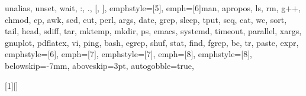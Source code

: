 {{         unalias, unset, wait, :, ., [, ]},
emphstyle=[5]{\color{builtins-color}}, %
emph=[6]{man, apropos, ls, rm, g++, chmod, cp, awk, sed, cut, perl, args, date, grep, sleep, tput, seq, cat, wc, sort, tail,
         head, sdiff, tar, mktemp, mkdir, ps, emacs, systemd, timeout, parallel, xargs, gnuplot, pdflatex, vi, ping, bash,
         egrep, shuf, stat, find, fgrep, bc, tr, paste, expr},
emphstyle=[6]{\color{external-color}}, %
emph=[7]{},
emphstyle=[7]{\color{variables-color}}, %
emph=[8]{},
emphstyle=[8]{\color{builtins-color}}, %
%
belowskip=-7mm,
aboveskip=3pt,
autogobble=true, %
}

[1][] %
    {\lstset{style=MyBash, #1}}
    {}

\def\bash{\lstinline[style=MyBash, basicstyle=\ttfamily\color{black}]}


